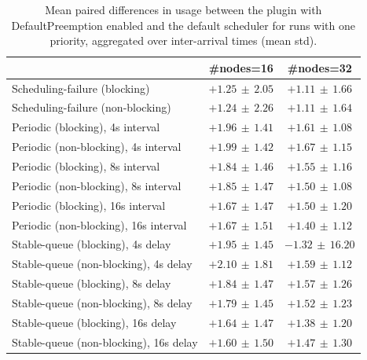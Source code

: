 \begin{table}[t]
\tiny
\setlength{\tabcolsep}{1.2pt}
\renewcommand{\arraystretch}{1.12}
\centering
\caption{Mean paired differences in usage between the plugin with DefaultPreemption enabled and the default scheduler for runs with one priority, aggregated over inter-arrival times (mean \pm std).}
\label{tab:usage-defpreempt1-prio1-std1-agg-arrival}
\begin{tabular}{l c c}
\toprule
 & \#nodes=16 & \#nodes=32 \\
\midrule
Scheduling-failure (blocking) & $+1.25\,\pm\,2.05$ & $+1.11\,\pm\,1.66$ \\
Scheduling-failure (non-blocking) & $+1.24\,\pm\,2.26$ & $+1.11\,\pm\,1.64$ \\
Periodic (blocking), 4s interval & $+1.96\,\pm\,1.41$ & $+1.61\,\pm\,1.08$ \\
Periodic (non-blocking), 4s interval & $+1.99\,\pm\,1.42$ & $+1.67\,\pm\,1.15$ \\
Periodic (blocking), 8s interval & $+1.84\,\pm\,1.46$ & $+1.55\,\pm\,1.16$ \\
Periodic (non-blocking), 8s interval & $+1.85\,\pm\,1.47$ & $+1.50\,\pm\,1.08$ \\
Periodic (blocking), 16s interval & $+1.67\,\pm\,1.47$ & $+1.50\,\pm\,1.20$ \\
Periodic (non-blocking), 16s interval & $+1.67\,\pm\,1.51$ & $+1.40\,\pm\,1.12$ \\
Stable-queue (blocking), 4s delay & $+1.95\,\pm\,1.45$ & $-1.32\,\pm\,16.20$ \\
Stable-queue (non-blocking), 4s delay & $+2.10\,\pm\,1.81$ & $+1.59\,\pm\,1.12$ \\
Stable-queue (blocking), 8s delay & $+1.84\,\pm\,1.47$ & $+1.57\,\pm\,1.26$ \\
Stable-queue (non-blocking), 8s delay & $+1.79\,\pm\,1.45$ & $+1.52\,\pm\,1.23$ \\
Stable-queue (blocking), 16s delay & $+1.64\,\pm\,1.47$ & $+1.38\,\pm\,1.20$ \\
Stable-queue (non-blocking), 16s delay & $+1.60\,\pm\,1.50$ & $+1.47\,\pm\,1.30$ \\
\bottomrule
\end{tabular}
\end{table}
